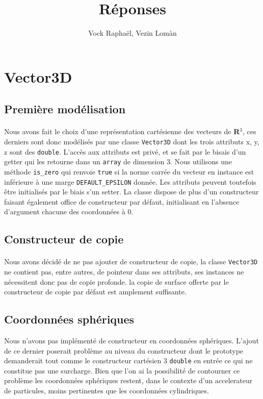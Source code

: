 \documentclass[12pt, letterpaper, twoside]{article}
\title{Réponses}
\author{Vock Raphaël, Vezin Lomàn}
\begin{document}
\maketitle
\section{Vector3D}

\subsection{Première modélisation}
\paragraph{}
Nous avons fait le choix d'une représentation cartésienne des vecteurs de \textbf{R}$^3$, ces derniers sont donc modélisés par une classe \texttt{Vector3D} dont les trois attributs x, y, z sont des \texttt{double}. L'accès aux attributs est privé, et se fait par le bisais d'un getter qui les retourne dans un \texttt{array} de dimension 3. Nous utilisons une méthode \texttt{is\_zero} qui renvoie \texttt{true} si la norme carrée du vecteur en instance est inférieure à une marge \texttt{DEFAULT\_EPSILON} donnée. Les attributs peuvent toutefois être initialisés par le biais s'un setter. La classe dispose de plus d'un constructeur faisant également office de constructeur par défaut, initialisant en l'absence d'argument chacune des coordonnées à 0.

\subsection{Constructeur de copie}
\paragraph{}
Nous avons décidé de ne pas ajouter de constructeur de copie, la classe \texttt{Vector3D} ne contient pas, entre autres, de pointeur dans ses attributs, ses instances ne nécessitent donc pas de copie profonde. la copie de surface offerte par le constructeur de copie par défaut est amplement suffisante.

\subsection{Coordonnées sphériques}
Nous n’avons pas implémenté de constructeur en coordonnées sphériques. L’ajout de ce dernier poserait problème au niveau du constructeur dont le prototype demanderait tout comme le constructeur cartésien 3 \texttt{double} en entrée ce qui ne constitue pas une surcharge. Bien que l’on ai la possibilité de contourner ce problème les coordonnées sphériques restent, dans le contexte d’un accelerateur de particules, moins pertinentes que les coordonnées cylindriques.
\end{document}
